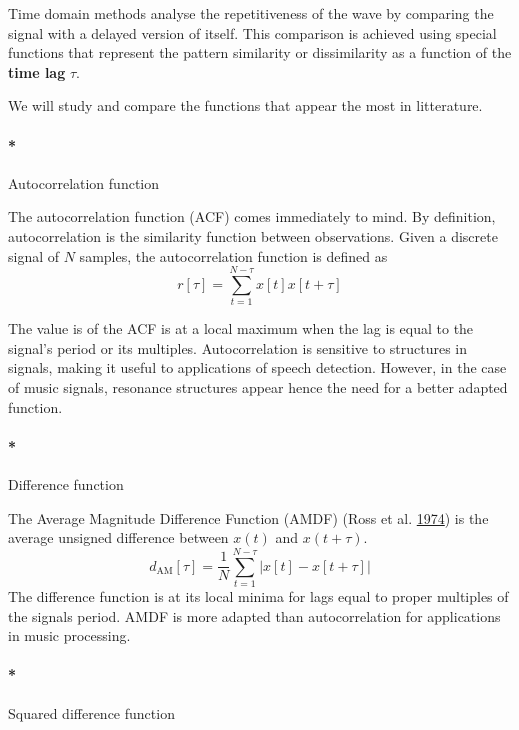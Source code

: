 \documentclass[
  american,
]{article}
\let\oldparagraph\paragraph
\renewcommand{\paragraph}[1]{\oldparagraph*{#1}}
\begin{document}
Time domain methods analyse the repetitiveness of the wave
by comparing the signal with a delayed version of itself.
This comparison is achieved using special functions that
represent the pattern similarity or dissimilarity
as a function of the \textbf{time lag} \(\tau\).

We will study and compare the functions that
appear the most in litterature.

\hypertarget{autocorrelation-function}{%
\paragraph*{Autocorrelation function}\label{autocorrelation-function}}

The autocorrelation function (ACF) comes immediately to mind.
By definition, autocorrelation is the similarity
function between observations.
Given a discrete signal of \(N\) samples, the autocorrelation
function is defined as
\[r[\tau] = \sum_{t=1}^{N-\tau} x[t]x[t+\tau]\]

The value is of the ACF is at a local maximum when the lag is equal
to the signal's period or its multiples.
Autocorrelation is sensitive to structures in signals,
making it useful to applications of speech detection.
However, in the case of music signals, resonance structures
appear hence the need for a better adapted function.

\hypertarget{difference-function}{%
\paragraph*{Difference function}\label{difference-function}}

The Average Magnitude Difference Function (AMDF) (Ross et al. \protect\hyperlink{ref-ross_average_1974}{1974})
is the average unsigned difference between \(x(t)\) and \(x(t+\tau)\).
\[d_{\text{AM}}[\tau] = \frac{1}{N}
    \sum_{t=1}^{N-\tau} \left\lvert x[t]-x[t+\tau]\right\rvert\]
The difference function is at its local minima for lags equal to
proper multiples of the signals period.
AMDF is more adapted than autocorrelation for applications
in music processing.

\hypertarget{squared-difference-function}{%
\paragraph*{Squared difference function}\label{squared-difference-function}}
\end{document}
